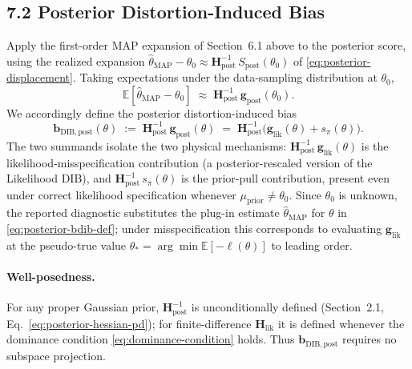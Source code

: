 \documentclass[11pt]{article}
\begin{document}
\subsection*{7.2 Posterior Distortion-Induced Bias}

Apply the first-order MAP expansion of Section~6.1 above to the posterior score, using the realized expansion $\hat\theta_{\mathrm{MAP}} - \theta_0 \approx \mathbf H_{\mathrm{post}}^{-1}\, S_{\mathrm{post}}(\theta_0)$ of \eqref{eq:posterior-displacement}. Taking expectations under the data-sampling distribution at $\theta_0$,
\begin{equation}
\mathbb{E}\!\left[\hat\theta_{\mathrm{MAP}} - \theta_0\right]
\;\approx\;
\mathbf H_{\mathrm{post}}^{-1}\, \mathbf g_{\mathrm{post}}(\theta_0).
\label{eq:posterior-bdib-derivation}
\end{equation}
We accordingly define the posterior distortion-induced bias
\begin{equation}
\mathbf b_{\mathrm{DIB},\mathrm{post}}(\theta)
\;:=\;
\mathbf H_{\mathrm{post}}^{-1}\, \mathbf g_{\mathrm{post}}(\theta)
\;=\;
\mathbf H_{\mathrm{post}}^{-1}\bigl(\mathbf g_{\mathrm{lik}}(\theta) + s_\pi(\theta)\bigr).
\label{eq:posterior-bdib-def}
\end{equation}
The two summands isolate the two physical mechanisms: $\mathbf H_{\mathrm{post}}^{-1}\,\mathbf g_{\mathrm{lik}}(\theta)$ is the likelihood-misspecification contribution (a posterior-rescaled version of the Likelihood DIB), and $\mathbf H_{\mathrm{post}}^{-1}\, s_\pi(\theta)$ is the prior-pull contribution, present even under correct likelihood specification whenever $\mu_{\mathrm{prior}} \neq \theta_0$. Since $\theta_0$ is unknown, the reported diagnostic substitutes the plug-in estimate $\hat\theta_{\mathrm{MAP}}$ for $\theta$ in \eqref{eq:posterior-bdib-def}; under misspecification this corresponds to evaluating $\mathbf g_{\mathrm{lik}}$ at the pseudo-true value $\theta_\ast = \arg\min \mathbb{E}[-\ell(\theta)]$ to leading order.

\paragraph{Well-posedness.}
For any proper Gaussian prior, $\mathbf H_{\mathrm{post}}^{-1}$ is unconditionally defined (Section~2.1, Eq.~\eqref{eq:posterior-hessian-pd}); for finite-difference $\mathbf H_{\mathrm{lik}}$ it is defined whenever the dominance condition \eqref{eq:dominance-condition} holds. Thus $\mathbf b_{\mathrm{DIB},\mathrm{post}}$ requires no subspace projection.
\end{document}
